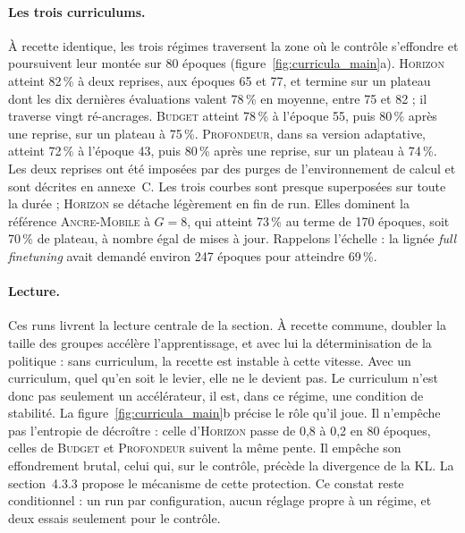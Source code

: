 \documentclass[11pt,a4paper]{article}
\begin{document}
\paragraph{Les trois curriculums.} À recette identique, les trois régimes traversent la zone où le contrôle s'effondre et poursuivent leur montée sur 80 époques (figure~\ref{fig:curricula_main}a). \textsc{Horizon} atteint 82\,\% à deux reprises, aux époques 65 et 77, et termine sur un plateau dont les dix dernières évaluations valent 78\,\% en moyenne, entre 75 et 82 ; il traverse vingt ré-ancrages. \textsc{Budget} atteint 78\,\% à l'époque 55, puis 80\,\% après une reprise, sur un plateau à 75\,\%. \textsc{Profondeur}, dans sa version adaptative, atteint 72\,\% à l'époque 43, puis 80\,\% après une reprise, sur un plateau à 74\,\%. Les deux reprises ont été imposées par des purges de l'environnement de calcul et sont décrites en annexe~C. Les trois courbes sont presque superposées sur toute la durée ; \textsc{Horizon} se détache légèrement en fin de run. Elles dominent la référence \textsc{Ancre-Mobile} à $G=8$, qui atteint 73\,\% au terme de 170 époques, soit 70\,\% de plateau, à nombre égal de mises à jour. Rappelons l'échelle : la lignée \emph{full finetuning} avait demandé environ 247 époques pour atteindre 69\,\%.

\paragraph{Lecture.} Ces runs livrent la lecture centrale de la section. À recette commune, doubler la taille des groupes accélère l'apprentissage, et avec lui la déterminisation de la politique : sans curriculum, la recette est instable à cette vitesse. Avec un curriculum, quel qu'en soit le levier, elle ne le devient pas. Le curriculum n'est donc pas seulement un accélérateur, il est, dans ce régime, une condition de stabilité. La figure~\ref{fig:curricula_main}b précise le rôle qu'il joue. Il n'empêche pas l'entropie de décroître : celle d'\textsc{Horizon} passe de 0{,}8 à 0{,}2 en 80 époques, celles de \textsc{Budget} et \textsc{Profondeur} suivent la même pente. Il empêche son effondrement brutal, celui qui, sur le contrôle, précède la divergence de la KL. La section~4.3.3 propose le mécanisme de cette protection. Ce constat reste conditionnel : un run par configuration, aucun réglage propre à un régime, et deux essais seulement pour le contrôle.
\end{document}
